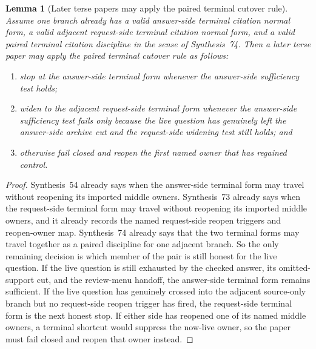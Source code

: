 \documentclass[11pt]{article}
\newtheorem{lemma}{Lemma}
\begin{document}
\begin{lemma}[Later terse papers may apply the paired terminal cutover rule]
Assume one branch already has a valid answer-side terminal citation normal form, a valid adjacent request-side terminal citation normal form, and a valid paired terminal citation discipline in the sense of Synthesis~74.
Then a later terse paper may apply the paired terminal cutover rule as follows:
\begin{enumerate}[leftmargin=2em]
    \item stop at the answer-side terminal form whenever the answer-side sufficiency test holds;
    \item widen to the adjacent request-side terminal form whenever the answer-side sufficiency test fails only because the live question has genuinely left the answer-side archive cut and the request-side widening test still holds; and
    \item otherwise fail closed and reopen the first named owner that has regained control.
\end{enumerate}
\end{lemma}

\begin{proof}
Synthesis~54 already says when the answer-side terminal form may travel without reopening its imported middle owners.
Synthesis~73 already says when the request-side terminal form may travel without reopening its imported middle owners, and it already records the named request-side reopen triggers and reopen-owner map.
Synthesis~74 already says that the two terminal forms may travel together as a paired discipline for one adjacent branch.
So the only remaining decision is which member of the pair is still honest for the live question.
If the live question is still exhausted by the checked answer, its omitted-support cut, and the review-menu handoff, the answer-side terminal form remains sufficient.
If the live question has genuinely crossed into the adjacent source-only branch but no request-side reopen trigger has fired, the request-side terminal form is the next honest stop.
If either side has reopened one of its named middle owners, a terminal shortcut would suppress the now-live owner, so the paper must fail closed and reopen that owner instead.\qedhere
\end{proof}
\end{document}
